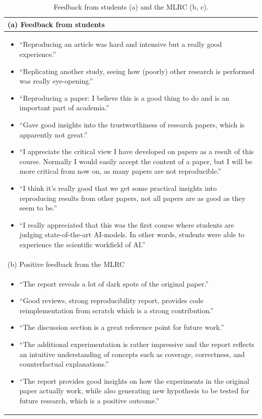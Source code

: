 
\begin{table}[h]
\caption{Feedback from students (a) and the MLRC (b, c).}
\centering
\begin{tabular}{@{}l@{}}
\toprule
(a) Feedback from students \\
\midrule
\begin{minipage}[t]{\columnwidth}
\begin{itemize}[leftmargin=*]
    \item ``Reproducing an article was hard and intensive but a really good experience.''
     \item ``Replicating another study, seeing how (poorly) other research is performed was really eye-opening.''
    \item ``Reproducing a paper: I believe this is a good thing to do and is an important part of academia.''
    \item  ``Gave good insights into the trustworthiness of research papers, which is apparently not great.''
    \item ``I appreciate the critical view I have developed on papers as a result of this course. Normally I would easily accept the content of a paper, but I will be more critical from now on, as many papers are not reproducible.''
    \item ``I think it's really good that we get some practical insights into reproducing results from other papers, not all papers are as good as they seem to be.''
    \item ``I really appreciated that this was the first course where students are judging state-of-the-art AI-models. In other words, students were able to experience the scientific workfield of AI.''
\end{itemize}
\end{minipage}
\\
\midrule
(b) Positive feedback from the MLRC \\
\midrule
\begin{minipage}[t]{\columnwidth}
\begin{itemize}[leftmargin=*]
\item ``The report reveals a lot of dark spots of the original paper.''
\item ``Good reviews, strong reproducibility report, provides code reimplementation from scratch which is a strong contribution.''
\item ``The discussion section is a great reference point for future work.''
\item ``The additional experimentation is rather impressive and the report reflects  an intuitive understanding of concepts such as  coverage, correctness, and counterfactual explanations.''
\item ``The report provides good insights on how the experiments in the original paper actually work, while also generating new hypothesis to be tested for future research, which is a positive outcome.''



\end{itemize}
\end{minipage}
\end{tabular}
\end{table}
